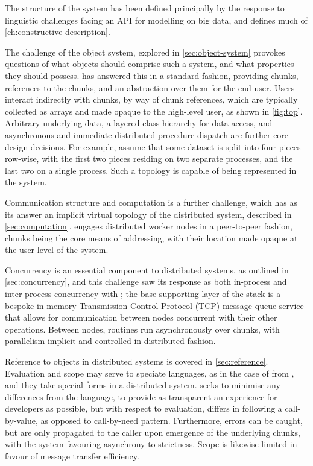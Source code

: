 The structure of the \lsr{} system has been defined principally by the response to linguistic challenges facing an API for modelling on big data, and defines much of \cref{ch:constructive-description}.

The challenge of the object system, explored in \cref{sec:object-system} provokes questions of what objects should comprise such a system, and what properties they should possess.
\lsr{} has answered this in a standard fashion, providing chunks, references to the chunks, and an abstraction over them for the end-user.
Users interact indirectly with chunks, by way of chunk references, which are typically collected as arrays and made opaque to the high-level user, as shown in \cref{fig:top}.
Arbitrary underlying data, a layered class hierarchy for data access, and asynchronous and immediate distributed procedure dispatch are further core design decisions.
For example, assume that some dataset is split into four pieces row-wise, with the first two pieces residing on two separate processes, and the last two on a single process.
Such a topology is capable of being represented in the \lsr{} system.


Communication structure and computation is a further challenge, which has as its answer an implicit virtual topology of the distributed system, described in \cref{sec:computation}.
\lsr{} engages distributed worker nodes in a peer-to-peer fashion, chunks being the core means of addressing, with their location made opaque at the user-level of the system.

Concurrency is an essential component to distributed systems, as outlined in \cref{sec:concurrency}, and this challenge saw its response as both in-process and inter-process concurrency with \lsr{}; the base supporting layer of the \lsr{} stack is a bespoke in-memory Transmission Control Protocol (TCP) message queue service that allows for communication between nodes concurrent with their other operations.
Between nodes, routines run asynchronously over chunks, with parallelism implicit and controlled in distributed fashion.

Reference to objects in distributed systems is covered in \cref{sec:reference}.
Evaluation and scope may serve to speciate languages, as in the case of \R{} from , and they take special forms in a distributed system.
\lsr{} seeks to minimise any differences from the \R{} language, to provide as transparent an experience for developers as possible, but with respect to evaluation, differs in following a call-by-value, as opposed to call-by-need pattern.
Furthermore, errors can be caught, but are only propagated to the caller upon emergence of the underlying chunks, with the system favouring asynchrony to strictness.
Scope is likewise limited in favour of message transfer efficiency.


